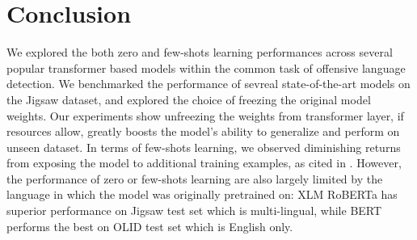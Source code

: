 \documentclass[11pt,a4paper]{article}
\begin{document}
\section{Conclusion}
We explored the both zero and few-shots learning performances across several popular transformer based models within the common task of offensive language detection. We benchmarked the performance of sevreal state-of-the-art models on the Jigsaw dataset, and explored the choice of freezing the original model weights. Our experiments show unfreezing the weights from transformer layer, if resources allow, greatly boosts the model's ability to generalize and perform on unseen dataset. In terms of few-shots learning, we observed diminishing returns from exposing the model to additional training examples, as cited in \citep{cer2018universal}. However, the performance of zero or few-shots learning are also largely limited by the language in which the model was originally pretrained on: XLM RoBERTa has superior performance on Jigsaw test set which is multi-lingual, while BERT performs the best on OLID test set which is English only. 



\end{document}
